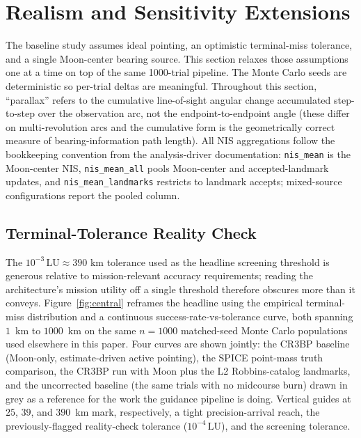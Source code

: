 \documentclass[10pt,twocolumn]{article}
\newcommand{\LU}{\mathrm{LU}}
\begin{document}
\section{Realism and Sensitivity Extensions}
\label{sec:realism}
The baseline study assumes ideal pointing, an optimistic terminal-miss tolerance, and a single Moon-center bearing source.  This section relaxes those assumptions one at a time on top of the same 1000-trial pipeline.  The Monte Carlo seeds are deterministic so per-trial deltas are meaningful.  Throughout this section, ``parallax'' refers to the cumulative line-of-sight angular change accumulated step-to-step over the observation arc, not the endpoint-to-endpoint angle (these differ on multi-revolution arcs and the cumulative form is the geometrically correct measure of bearing-information path length).  All NIS aggregations follow the bookkeeping convention from the analysis-driver documentation: \texttt{nis\_mean} is the Moon-center NIS, \texttt{nis\_mean\_all} pools Moon-center and accepted-landmark updates, and \texttt{nis\_mean\_landmarks} restricts to landmark accepts; mixed-source configurations report the pooled column.

\subsection{Terminal-Tolerance Reality Check}
\label{sec:realism-tolerance}
The $10^{-3}\,\LU \approx 390$ km tolerance used as the headline screening threshold is generous relative to mission-relevant accuracy requirements; reading the architecture's mission utility off a single threshold therefore obscures more than it conveys.  Figure~\ref{fig:central} reframes the headline using the empirical terminal-miss distribution and a continuous success-rate-vs-tolerance curve, both spanning $1$~km to $1000$~km on the same $n=1000$ matched-seed Monte Carlo populations used elsewhere in this paper.  Four curves are shown jointly: the CR3BP baseline (Moon-only, estimate-driven active pointing), the SPICE point-mass truth comparison, the CR3BP run with Moon plus the L2 Robbins-catalog landmarks, and the uncorrected baseline (the same trials with no midcourse burn) drawn in grey as a reference for the work the guidance pipeline is doing.  Vertical guides at $25$, $39$, and $390$~km mark, respectively, a tight precision-arrival reach, the previously-flagged reality-check tolerance ($10^{-4}\,\LU$), and the screening tolerance.
\end{document}
